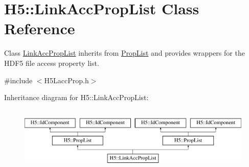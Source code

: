 \hypertarget{class_h5_1_1_link_acc_prop_list}{}\section{H5\+:\+:Link\+Acc\+Prop\+List Class Reference}
\label{class_h5_1_1_link_acc_prop_list}


Class \hyperlink{class_h5_1_1_link_acc_prop_list}{Link\+Acc\+Prop\+List} inherits from \hyperlink{class_h5_1_1_prop_list}{Prop\+List} and provides wrappers for the H\+D\+F5 file access property list.  




{\ttfamily \#include $<$H5\+Lacc\+Prop.\+h$>$}

Inheritance diagram for H5\+:\+:Link\+Acc\+Prop\+List\+:\begin{figure}[H]
\begin{center}
\leavevmode
\includegraphics[height=3.000000cm]{class_h5_1_1_link_acc_prop_list}
\end{center}
\end{figure}
